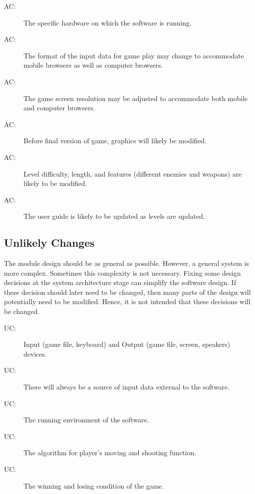 \documentclass[12pt, titlepage]{article}
\newcounter{acnum}
\newcommand{\actheacnum}{AC\theacnum}
\newcounter{ucnum}
\newcommand{\uctheucnum}{UC\theucnum}
\begin{document}
\begin{description}
\item[ \actheacnum \label{acHardware}:] The specific
  hardware on which the software is running.
\item[ \actheacnum \label{acInput}:] The format of the input data for game play may change to accommodate mobile browsers as well as computer browsers.
\item[ \actheacnum \label{acScreenDim}:] The game screen resolution may be adjusted to accommodate both mobile and computer browsers. 
\item[ \actheacnum \label{acGraphics}:] Before final version of game, graphics will likely be modified. 
\item[ \actheacnum \label{acLevel}:] Level difficulty, length, and features (different enemies and weapons) are likely to be modified. 
\item[ \actheacnum \label{acUserGuide}:] The user guide is likely to be updated as levels are updated. 
\end{description}

\subsection{Unlikely Changes} \label{SecUchange}

The module design should be as general as possible. However, a general system is
more complex. Sometimes this complexity is not necessary. Fixing some design
decisions at the system architecture stage can simplify the software design. If
these decision should later need to be changed, then many parts of the design
will potentially need to be modified. Hence, it is not intended that these
decisions will be changed.

\begin{description}
\item[ \uctheucnum \label{ucIO}:] Input (game file, keyboard) and Output (game file, screen, speakers) devices. 
\item[ \uctheucnum \label{ucInput}:] There will always be
  a source of input data external to the software.
\item[ \uctheucnum \label{ucEnv}:] The running environment of the software.
\item[ \uctheucnum \label{ucPalg}:] The algorithm for player's moving and shooting function.
\item[ \uctheucnum \label{ucWinLose}:] The winning and losing condition of the game.
\end{description}
\end{document}

